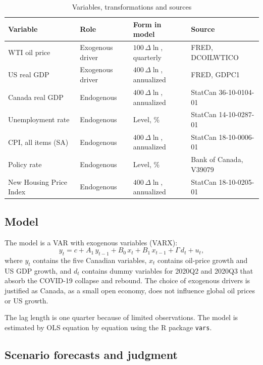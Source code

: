 \documentclass[11pt]{article}
\begin{document}
\begin{table}[htbp]
\centering
\caption{Variables, transformations and sources}
\small
\begin{tabular}{llll}
\toprule
Variable & Role & Form in model & Source \\
\midrule
WTI oil price           & Exogenous driver & $100\,\Delta\ln$, quarterly       & FRED, DCOILWTICO \\
US real GDP             & Exogenous driver & $400\,\Delta\ln$, annualized       & FRED, GDPC1 \\
Canada real GDP         & Endogenous       & $400\,\Delta\ln$, annualized       & StatCan 36-10-0104-01 \\
Unemployment rate       & Endogenous       & Level, \%                          & StatCan 14-10-0287-01 \\
CPI, all items (SA)     & Endogenous       & $400\,\Delta\ln$, annualized       & StatCan 18-10-0006-01 \\
Policy rate             & Endogenous       & Level, \%                          & Bank of Canada, V39079 \\
New Housing Price Index & Endogenous       & $400\,\Delta\ln$, annualized       & StatCan 18-10-0205-01 \\
\bottomrule
\end{tabular}
\end{table}

\subsection{Model}

The model is a VAR with exogenous variables (VARX):
\begin{equation}
  y_t = c + A_1\, y_{t-1} + B_0\, x_t + B_1\, x_{t-1} + \Gamma\, d_t + u_t ,
\end{equation}
where $y_t$ contains the five Canadian variables, $x_t$ contains oil-price growth and US GDP growth,
and $d_t$ contains dummy variables for 2020Q2 and 2020Q3 that absorb the COVID-19 collapse and rebound.
The choice of exogenous drivers is justified as Canada, as a small open economy, does not influence global oil prices or US growth. 

The lag length is one quarter because of limited observations. The model is estimated by OLS equation by equation using
the R package \texttt{vars}.

\subsection{Scenario forecasts and judgment}
\end{document}
